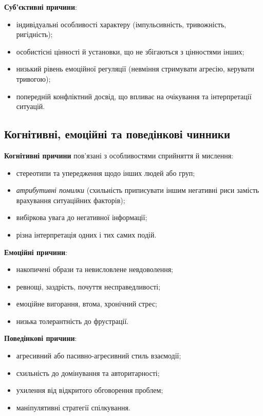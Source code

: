 \documentclass[12pt,a4paper]{article}
\begin{document}
    \textbf{Суб’єктивні причини}:
    \begin{itemize}
        \item індивідуальні особливості характеру (імпульсивність, тривожність, ригідність);
        \item особистісні цінності й установки, що не збігаються з цінностями інших;
        \item низький рівень емоційної регуляції (невміння стримувати агресію, керувати тривогою);
        \item попередній конфліктний досвід, що впливає на очікування та інтерпретації ситуацій.
    \end{itemize}

    \subsection*{Когнітивні, емоційні та поведінкові чинники}
    \textbf{Когнітивні причини} пов’язані з особливостями сприйняття й мислення:
    \begin{itemize}
        \item стереотипи та упередження щодо інших людей або груп;
        \item \textit{атрибутивні помилки} (схильність приписувати іншим негативні риси замість врахування ситуаційних факторів);
        \item вибіркова увага до негативної інформації;
        \item різна інтерпретація одних і тих самих подій.
    \end{itemize}

    \textbf{Емоційні причини}:
    \begin{itemize}
        \item накопичені образи та невисловлене невдоволення;
        \item ревнощі, заздрість, почуття несправедливості;
        \item емоційне вигорання, втома, хронічний стрес;
        \item низька толерантність до фрустрації.
    \end{itemize}

    \textbf{Поведінкові причини}:
    \begin{itemize}
        \item агресивний або пасивно-агресивний стиль взаємодії;
        \item схильність до домінування та авторитарності;
        \item ухилення від відкритого обговорення проблем;
        \item маніпулятивні стратегії спілкування.
    \end{itemize}
\end{document}
